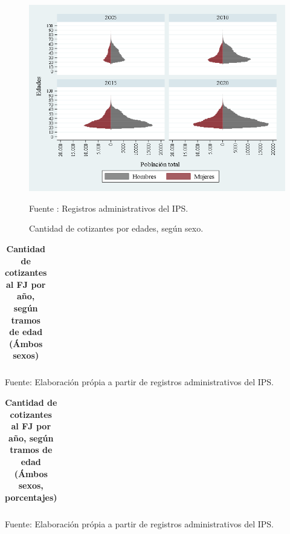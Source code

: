 \begin{figure}[H]
\begin{center}
                    \caption{Cantidad de cotizantes por edades, según sexo. }
                    \includegraphics[scale=0.55]{RA_IPS_cotizaciones_2010a2020_piramide_pob.png}
                                    \item \footnotesize Fuente : Registros administrativos del IPS. 
                    \end{center}
\end{figure}

\begin{table}[H]
\begin{center}
\scriptsize     
\caption{\bf{Cantidad de cotizantes al FJ por año, según tramos de edad (Ámbos sexos)}}
\begin{tabular}{l|rrrrrrrrrrrrr}

\end{tabular}
                    \item Fuente: Elaboración própia a partir de registros administrativos del IPS.
\end{center}
\end{table}

\begin{table}[H]
\begin{center}
\scriptsize     
\caption{\bf{Cantidad de cotizantes al FJ por año, según tramos de edad (Ámbos sexos, porcentajes)}}
\begin{tabular}{l|rrrrrrrrrrrrr}

\end{tabular}
                    \item Fuente: Elaboración própia a partir de registros administrativos del IPS.
\end{center}
\end{table}

